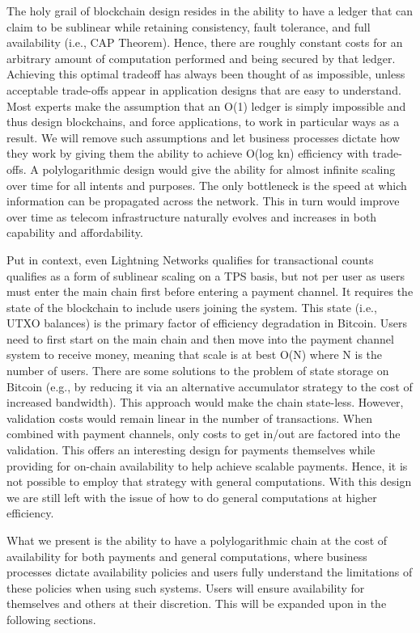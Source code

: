 \documentclass[peerreview]{ieeesyscoin}
\begin{document}
The holy grail of blockchain design resides in the ability to have a ledger that can claim to be sublinear while retaining consistency, fault tolerance, and full availability (i.e., CAP Theorem). Hence, there are roughly constant costs for an arbitrary amount of computation performed and being secured by that ledger. Achieving this optimal tradeoff has always been thought of as impossible, unless acceptable trade-offs appear in application designs that are easy to understand. Most experts make the assumption that an O(1) ledger is simply impossible and thus design blockchains, and force applications, to work in particular ways as a result. We will remove such assumptions and let business processes dictate how they work by giving them the ability to achieve O(log kn) efficiency with trade-offs. A polylogarithmic design would give the ability for almost infinite scaling over time for all intents and purposes. The only bottleneck is the speed at which information can be propagated across the network. This in turn would improve over time as telecom infrastructure naturally evolves and increases in both capability and affordability.

Put in context, even Lightning Networks qualifies for transactional counts qualifies as a form of sublinear scaling on a TPS basis, but not per user as users must enter the main chain first before entering a payment channel. It requires the state of the blockchain to include users joining the system. This state (i.e., UTXO balances) is the primary  factor of efficiency degradation in Bitcoin. Users need to first start on the main chain and then move into the payment channel system to receive money, meaning that scale is at best O(N) where N is the number of users. There are some solutions to the problem of state storage on Bitcoin \cite{Dry19} (e.g., by reducing it via an alternative accumulator strategy to the cost of increased bandwidth). This approach would make the chain state-less. However, validation costs would remain linear in the number of transactions. When combined with payment channels, only costs to get in/out are factored into the validation. This offers an interesting design for payments themselves while providing for on-chain availability to help achieve scalable payments. Hence, it is not possible to employ that strategy with general computations. With this design we are still left with the issue of how to do general computations at higher efficiency.

What we present is the ability to have a polylogarithmic chain at the cost of availability for both payments and general computations, where business processes dictate availability policies and users fully understand the limitations of these policies when using such systems. Users will ensure availability for themselves and others at their discretion.  This will be expanded upon in the following sections.
\end{document}
